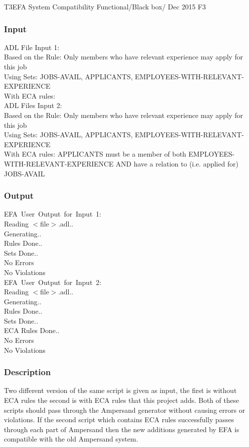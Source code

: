 \documentclass[12pt]{report}
\begin{document}
\systemTest
{T3}{EFA System Compatibility}
{Functional/Black box/ }
{Dec 2015}
{F3}
\vspace{-12pt}\subsubsection*{Input}
ADL File Input 1: \\
	Based on the Rule: Only members who have relevant experience may apply for 
	this 
	job \\
	Using Sets: JOBS-AVAIL, APPLICANTS, EMPLOYEES-WITH-RELEVANT-EXPERIENCE \\
	With ECA rules:\\
	ADL Files Input 2:\\
	Based on the Rule: Only members who have relevant experience may apply for 
	this 
	job \\
	Using Sets: JOBS-AVAIL, APPLICANTS, EMPLOYEES-WITH-RELEVANT-EXPERIENCE \\
	With ECA rules: APPLICANTS must be a member of both 
	EMPLOYEES-WITH-RELEVANT-EXPERIENCE AND have a relation to (i.e. applied 
	for) 
	JOBS-AVAIL \\
	
\vspace{-12pt}\subsubsection*{Output}
EFA\ User\ Output\ for\ Input\ 1: \\
	Reading $<$file$>$.adl.. \\
	Generating.. \\
	Rules Done.. \\
	Sets Done.. \\
	No Errors \\
	No Violations \\
	EFA\ User\ Output\ for\ Input\ 2: \\
	Reading $<$file$>$.adl..\\
	Generating.. \\
	Rules Done.. \\
	Sets Done.. \\
	ECA Rules Done.. \\
	No Errors \\
	No Violations \\
	
\vspace{-12pt}\subsubsection*{Description}
Two different version of the same script is given as input, the first is 
without ECA rules the second is with ECA rules that this project adds. Both of 
these scripts should pass through the Ampersand generator without causing 
errors or violations. If the second script which contains ECA rules 
successfully passes through each part of Ampersand then the new additions 
generated by EFA is compatible with the old Ampersand system.
\end{document}
